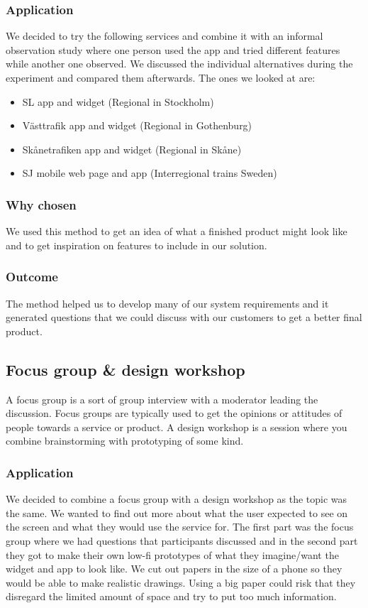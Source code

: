 \documentclass[a4paper]{article}
\begin{document}
		\subsubsection{Application}
			We decided to try the following services and combine it with an informal observation study where one person used the app and tried different features while another one observed. We discussed the individual alternatives during the experiment and compared them afterwards. The ones we looked at are:
			\begin{itemize}
				\item SL app and widget (Regional in Stockholm)
				\item Västtrafik app and widget (Regional in Gothenburg)
				\item Skånetrafiken app and widget (Regional in Skåne)
				\item SJ mobile web page and app (Interregional trains Sweden)
			\end{itemize}
	
		\subsubsection{Why chosen}
		We used this method to get an idea of what a finished product might look like and to get inspiration on features to include in our solution.
		\subsubsection{Outcome}
		The method helped us to develop many of our system requirements and it generated questions that we could discuss with our customers to get a better final product.


		\subsection{Focus group \& design workshop}
		A focus group is a sort of group interview with a moderator leading the discussion. Focus groups are typically used to get the opinions or attitudes of people towards a service or product. A design workshop is a session where you combine brainstorming with prototyping of some kind.
		\subsubsection{Application}
		We decided to combine a focus group with a design workshop as the topic was the same. We wanted to find out more about what the user expected to see on the screen and what they would use the service for. The first part was the focus group where we had questions that participants discussed and in the second part they got to make their own low-fi prototypes of what they imagine/want the widget and app to look like. We cut out papers in the size of a phone so they would be able to make realistic drawings. Using a big paper could risk that they disregard the limited amount of space and try to put too much information.
	
\end{document}
